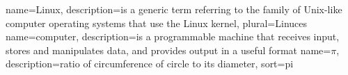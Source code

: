 

{
  name=Linux,
  description={is a generic term referring to the family of Unix-like
               computer operating systems that use the Linux kernel},
  plural=Linuces
}
{
  name=computer,
  description={is a programmable machine that receives input,
               stores and manipulates data, and provides
               output in a useful format}
}
{
  name={\ensuremath{\pi}},
  description={ratio of circumference of circle to its
               diameter},
  sort=pi
}